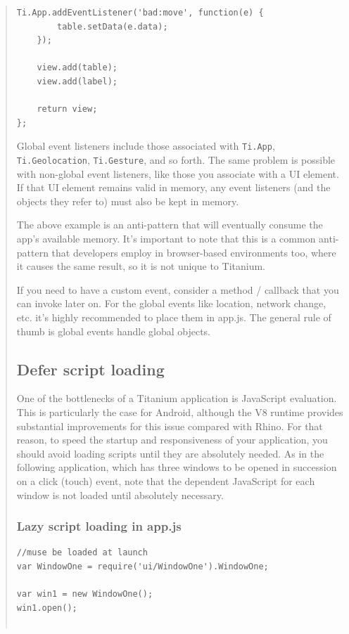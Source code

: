 \documentclass[11pt]{book}
\begin{document}
\begin{quotation}
\begin{lstlisting}[frame=single]
    Ti.App.addEventListener('bad:move', function(e) {
        table.setData(e.data);
    });

    view.add(table);
    view.add(label);

    return view;
};
\end{lstlisting}

Global event listeners include those associated with \texttt{Ti.App}, \texttt{Ti.Geolocation}, \texttt{Ti.Gesture}, and so forth. The same problem is possible with non-global event listeners, like those you associate with a UI element. If that UI element remains valid in memory, any event listeners (and the objects they refer to) must also be kept in memory.

The above example is an anti-pattern that will eventually consume the app's available memory. It's important to note that this is a common anti-pattern that developers employ in browser-based environments too, where it causes the same result, so it is not unique to Titanium.

If you need to have a custom event, consider a method / callback that you can invoke later on. For the global events like location, network change, etc. it's highly recommended to place them in app.js. The general rule of thumb is global events handle global objects.

\subsection{Defer script loading}
One of the bottlenecks of a Titanium application is JavaScript evaluation. This is particularly the case for Android, although the V8 runtime provides substantial improvements for this issue compared with Rhino. For that reason, to speed the startup and responsiveness of your application, you should avoid loading scripts until they are absolutely needed. As in the following application, which has three windows to be opened in succession on a click (touch) event, note that the dependent JavaScript for each window is not loaded until absolutely necessary.

\subsubsection{Lazy script loading in app.js}
\begin{lstlisting}[frame=single]
//muse be loaded at launch
var WindowOne = require('ui/WindowOne').WindowOne;

var win1 = new WindowOne();
win1.open();


\end{lstlisting}
\end{quotation}
\end{document}
